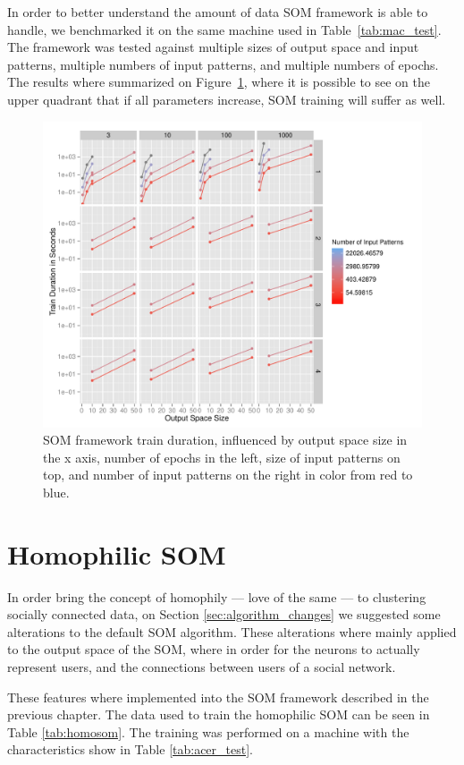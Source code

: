In order to better understand the amount of data \ac{SOM} framework is able to handle, we benchmarked it on the same machine used in Table~\ref{tab:mac_test}. The framework was tested against multiple sizes of output space and input patterns, multiple numbers of input patterns, and multiple numbers of epochs. 
The results where summarized on Figure~\ref{fig:benchmarkingsom}, where it is possible to see on the upper quadrant that if all parameters increase, \ac{SOM} training will suffer as well.

\begin{figure}[htpb]
  \centering
  \includegraphics[width=0.8\linewidth]{./plots/som/benchmarking.pdf}
  \caption{SOM framework train duration, influenced by output space size in the x axis, number of epochs in the left, size of input patterns on top, and number of input patterns on the right in color from red to blue.}
  \label{fig:benchmarkingsom}
\end{figure}


\section{Homophilic SOM}
\label{sec:homophilic_som}

In order bring the concept of homophily --- love of the same --- to clustering socially connected data, on Section \ref{sec:algorithm_changes} we suggested some alterations to the default \ac{SOM} algorithm. These alterations where mainly applied to the output space of the \ac{SOM}, where in order for the neurons to actually represent users, and the connections between users of a social network. 

These features where implemented into the \ac{SOM} framework described in the previous chapter. The data used to train the homophilic \ac{SOM} can be seen in Table \ref{tab:homosom}. The training was performed on a machine with the characteristics show in Table \ref{tab:acer_test}.

